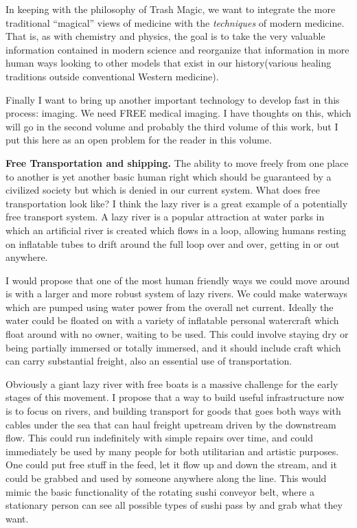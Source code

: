 In keeping with the philosophy of Trash Magic, we want to integrate the
more traditional ``magical'' views of medicine with the
\emph{techniques} of modern medicine. That is, as with chemistry and
physics, the goal is to take the very valuable information contained in
modern science and reorganize that information in more human ways
looking to other models that exist in our history(various healing
traditions outside conventional Western medicine).

Finally I want to bring up another important technology to develop fast
in this process: imaging. We need FREE medical imaging. I have thoughts
on this, which will go in the second volume and probably the third
volume of this work, but I put this here as an open problem for the
reader in this volume.

\textbf{Free Transportation and shipping.} The ability to move freely
from one place to another is yet another basic human right which should
be guaranteed by a civilized society but which is denied in our current
system. What does free transportation look like? I think the lazy river
is a great example of a potentially free transport system. A lazy river
is a popular attraction at water parks in which an artificial river is
created which flows in a loop, allowing humans resting on inflatable
tubes to drift around the full loop over and over, getting in or out
anywhere.

I would propose that one of the most human friendly ways we could move
around is with a larger and more robust system of lazy rivers. We could
make waterways which are pumped using water power from the overall net
current. Ideally the water could be floated on with a variety of
inflatable personal watercraft which float around with no owner, waiting
to be used. This could involve staying dry or being partially immersed
or totally immersed, and it should include craft which can carry
substantial freight, also an essential use of transportation.

Obviously a giant lazy river with free boats is a massive challenge for
the early stages of this movement. I propose that a way to build useful
infrastructure now is to focus on rivers, and building transport for
goods that goes both ways with cables under the sea that can haul
freight upstream driven by the downstream flow. This could run
indefinitely with simple repairs over time, and could immediately be
used by many people for both utilitarian and artistic purposes. One
could put free stuff in the feed, let it flow up and down the stream,
and it could be grabbed and used by someone anywhere along the line.
This would mimic the basic functionality of the rotating sushi conveyor
belt, where a stationary person can see all possible types of sushi pass
by and grab what they want.

